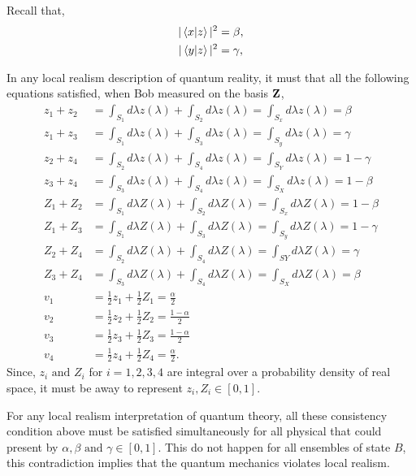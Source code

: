 Recall that,
\begin{align*}
|\bra{x}\ket{z}|^2&=\beta,\\
|\bra{y}\ket{z}|^2&=\gamma,\\
\end{align*}

In any local realism description of quantum reality, it must that all the following equations satisfied, when Bob measured on the basis $\bf{Z}$,
\begin{align}
z_1+z_2&=\int_{S_1} d\lambda z(\lambda)+\int_{S_2} d\lambda z(\lambda)=\int_{S_x} d\lambda z(\lambda)=\beta\label{Zies1}\\
z_1+z_3&=\int_{S_1} d\lambda z(\lambda)+\int_{S_3} d\lambda z(\lambda)=\int_{S_y} d\lambda z(\lambda)=\gamma\label{Zies2}\\
z_2+z_4&=\int_{S_2} d\lambda z(\lambda)+\int_{S_4} d\lambda z(\lambda)=\int_{S_Y} d\lambda z(\lambda)=1-\gamma\label{Zies4}\\
z_3+z_4&=\int_{S_3} d\lambda z(\lambda)+\int_{S_4} d\lambda z(\lambda)=\int_{S_X} d\lambda z(\lambda)=1-\beta\label{Zies3}\\
Z_1+Z_2&=\int_{S_1} d\lambda Z(\lambda)+\int_{S_2} d\lambda Z(\lambda)=\int_{S_x} d\lambda Z(\lambda)=1-\beta\label{Zies7}\\
Z_1+Z_3&=\int_{S_1} d\lambda Z(\lambda)+\int_{S_3} d\lambda Z(\lambda)=\int_{S_y} d\lambda Z(\lambda)=1-\gamma\label{Zies8}\\
Z_2+Z_4&=\int_{S_2} d\lambda Z(\lambda)+\int_{S_4} d\lambda Z(\lambda)=\int_{SY} d\lambda Z(\lambda)=\gamma\label{Zies6}\\
Z_3+Z_4&=\int_{S_3} d\lambda Z(\lambda)+\int_{S_4} d\lambda Z(\lambda)=\int_{S_X} d\lambda Z(\lambda)=\beta\label{Zies5}\\
v_1&=\frac{1}{2}z_1+\frac{1}{2}Z_1=\frac{\alpha}{2}\label{vies1}\\
v_2&=\frac{1}{2}z_2+\frac{1}{2}Z_2=\frac{1-\alpha}{2}\label{vies3}\\
 v_3&=\frac{1}{2}z_3+\frac{1}{2}Z_3=\frac{1-\alpha}{2}\label{vies4}\\
 v_4&=\frac{1}{2}z_4+\frac{1}{2}Z_4=\frac{\alpha}{2}\label{vies2}.
\end{align}
Since, $z_i\text{ and } Z_i$ for $i=1,2,3,4$  are integral over a probability density of real space, it must be away to represent $z_i, Z_i \in [0,1]$.

For any local realism interpretation of quantum theory, all these consistency condition above must be satisfied simultaneously for all physical that could present by $\alpha, \beta \text{ and } \gamma \in [0,1]$. This do not happen for all ensembles of state $B$, this contradiction implies that the quantum mechanics violates  local realism.
